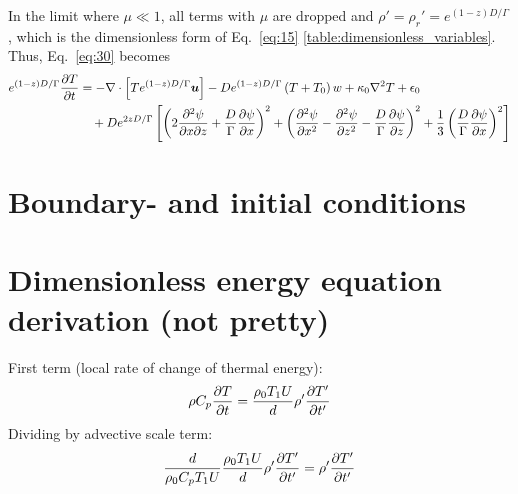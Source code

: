 \documentclass[a4paper]{article}
\begin{document}
In the limit where $\mu \ll 1$, all terms with $\mu$ are dropped and $\rho' = \rho_r' = e^{(1-z)D/\Gamma}$, which is the dimensionless form of
 Eq.~\eqref{eq:15} \ref{table:dimensionless_variables}. Thus, Eq.~\eqref{eq:30} becomes
\begin{align}
    e^{(1-z)D/\Gamma} \pdv{T}{t}
  &= -\nabla\cdot\left[ Te^{(1-z)D/\Gamma} \bm{u} \right]
     - D e^{(1-z)D/\Gamma} \left( T + T_0 \right) w
     + \kappa_0 \nabla^{2} T + \epsilon_0 \notag\\
  &\quad + D e^{2zD/\Gamma}
  \left[
    \left( 2\pdv{\psi}{x}{z} + \frac{D}{\Gamma}\pdv{\psi}{x} \right)^{2}
  + \left( \pdv[2]{\psi}{x} - \pdv[2]{\psi}{z} - \frac{D}{\Gamma}\pdv{\psi}{z} \right)^{2}
  + \frac{1}{3}\left( \frac{D}{\Gamma}\pdv{\psi}{x} \right)^{2}
  \right]
\end{align} 

\section{Boundary- and initial conditions}


\appendix

\section{Dimensionless energy equation derivation (not pretty)}
\begin{mdframed}
First term (local rate of change of thermal energy): 
    \begin{align*}
        \rho C_p\pdv{T}{t} &= \frac{\rho_0T_1U}{d} \rho' \pdv{T'}{t'} \\
    \end{align*}
Dividing by advective scale term: 
    \begin{align*}
        \frac{d}{\rho_0C_p T_1 U}\frac{\rho_0T_1U}{d} \rho' \pdv{T'}{t'} =\rho' \pdv{T'}{t'} \\
    \end{align*}
\end{mdframed}
\end{document}
